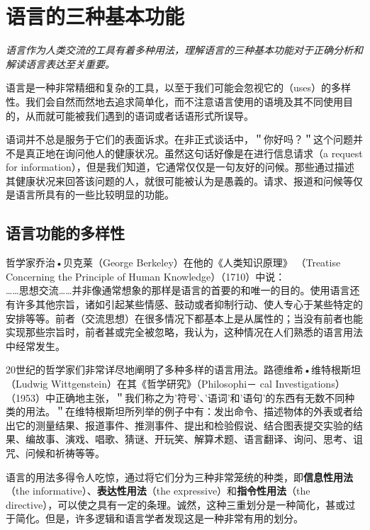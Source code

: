 \section{语言的三种基本功能}

\begin{logicbox}[title=引言]
\textit{语言作为人类交流的工具有着多种用法，理解语言的三种基本功能对于正确分析和解读语言表达至关重要。}
\end{logicbox}

语言是一种非常精细和复杂的工具，以至于我们可能会忽视它的（uses）的多样性。我们会自然而然地去追求简单化，而不注意语言使用的语境及其不同使用目的，从而就可能被我们遇到的语词或者话语形式所误导。

语词并不总是服务于它们的表面诉求。在非正式谈话中，＂你好吗？＂这个问题并不是真正地在询问他人的健康状况。虽然这句话好像是在进行信息请求（a request for information），但是我们知道，它通常仅仅是一句友好的问候。那些通过描述其健康状况来回答该问题的人，就很可能被认为是愚義的。请求、报道和问候等仅是语言所具有的一些比较明显的功能。

\subsection{语言功能的多样性}

哲学家乔治•贝克莱（George Berkeley）在他的《人类知识原理》 （Treatise Concerning the Principle of Human Knowledge）（1710）中说：\\
……思想交流……并非像通常想象的那样是语言的首要的和唯一的目的。使用语言还有许多其他宗旨，诸如引起某些情感、鼓动或者抑制行动、使人专心于某些特定的安排等等。前者（交流思想）在很多情况下都基本上是从属性的；当没有前者也能实现那些宗旨时，前者甚或完全被忽略，我认为，这种情况在人们熟悉的语言用法中经常发生。

20世纪的哲学家们非常详尽地阐明了多种多样的语言用法。路德维希•维特根斯坦（Ludwig Wittgenstein）在其《哲学研究》（Philosophi－ cal Investigations）（1953）中正确地主张，＂我们称之为'符号'、'语词'和'语句'的东西有无数不同种类的用法。＂在维特根斯坦所列举的例子中有：发出命令、描述物体的外表或者给出它的测量结果、报道事件、推测事件、提出和检验假说、结合图表提交实验的结果、编故事、演戏、唱歌、猜谜、开玩笑、解算术题、语言翻译、询问、思考、诅咒、问候和祈祷等等。

语言的用法多得令人吃惊，通过将它们分为三种非常笼统的种类，即\textbf{信息性用法}（the informative）、\textbf{表达性用法}（the expressive）和\textbf{指令性用法}（the directive），可以使之具有一定的条理。诚然，这种三重划分是一种简化，甚或过于简化。但是，许多逻辑和语言学者发现这是一种非常有用的划分。

